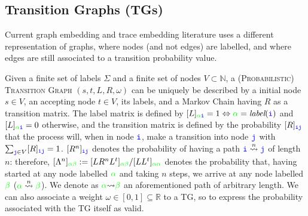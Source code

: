 %
%



\subsection{Transition Graphs (TGs)}\label{subsec:ppn}
Current graph embedding and trace embedding literature uses a different representation of graphs, where nodes (and not edges) are labelled, and where edges are still associated to a transition probability value.

Given a finite set of labels $\Sigma$ and a finite set of nodes $V\subset \mathbb{N}$,  a \textsc{(Probabilistic) Transition Graph} $(s,t,L,R,\omega)$ \cite{GartnerFW03} can be uniquely be described by a initial node $s\in V$, an accepting node $t\in V$, its labels, and a {Markov Chain having} $R$ as a transition matrix. The label matrix is defined by $[L]_{{\color{green}\alpha}\texttt{\color{blue}i}}=1\Leftrightarrow {\color{green}\alpha}=\textit{label}(\texttt{\color{blue}i})$ and $[L]_{{\color{green}\alpha}\texttt{\color{blue}i}}=0$ otherwise, and the transition matrix is defined by the probability $[R]_{\texttt{\color{blue}ij}}$ that the process will, when in node $\texttt{\color{blue}i}$, make a transition into node $\texttt{\color{blue}j}$ \cite{Prob} with $\sum_{\texttt{\color{blue}j}\in V}[R]_{\color{blue}\texttt{ij}}=1$. $[R^n]_{\texttt{\color{blue}ij}}$ denotes the probability of having a path $\texttt{\color{blue}i}\overset{n}{\rightsquigarrow}\texttt{\color{blue}j}$ of length $n$: therefore, $[\Lambda^n]_{\color{green}\alpha\beta}:=[LR^nL^t]_{\color{green}\alpha\beta}/[LL^t]_{\color{green}\alpha\alpha}$ denotes the probability that, having started at any node labelled $\color{green}\alpha$ and taking $n$ steps, we arrive at any node labelled $\color{green}\beta$ (${\color{green}\alpha}\overset{n}{\rightsquigarrow}{\color{green}\beta}$). We denote as ${\color{green}\alpha}{\rightsquigarrow}{\color{green}\beta}$ an aforementioned path of arbitrary length. 
We can also associate a weight $\omega\in[0,1]\subseteq\mathbb{R}$ to a TG, so to express the probability associated with the TG itself as valid. 





